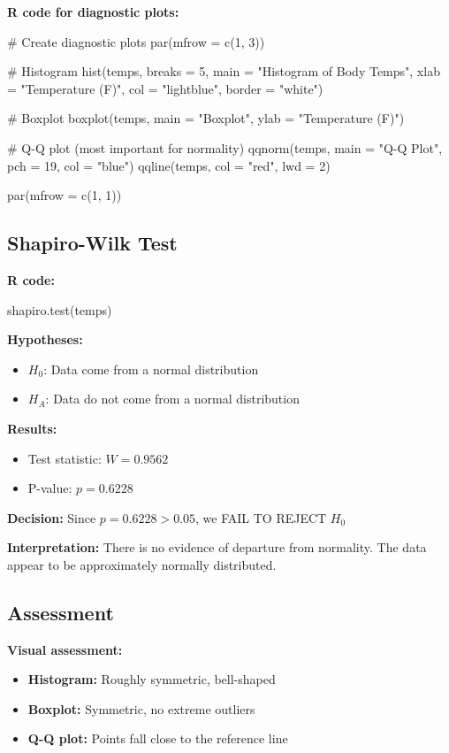 \documentclass[11pt]{article}
\begin{document}
\textbf{R code for diagnostic plots:}
\begin{rcode}
# Create diagnostic plots
par(mfrow = c(1, 3))

# Histogram
hist(temps, breaks = 5, main = "Histogram of Body Temps",
     xlab = "Temperature (F)", col = "lightblue", border = "white")

# Boxplot
boxplot(temps, main = "Boxplot", ylab = "Temperature (F)")

# Q-Q plot (most important for normality)
qqnorm(temps, main = "Q-Q Plot", pch = 19, col = "blue")
qqline(temps, col = "red", lwd = 2)

par(mfrow = c(1, 1))
\end{rcode}

\subsection*{Shapiro-Wilk Test}

\textbf{R code:}
\begin{rcode}
shapiro.test(temps)
\end{rcode}

\textbf{Hypotheses:}
\begin{itemize}
\item $H_0$: Data come from a normal distribution
\item $H_A$: Data do not come from a normal distribution
\end{itemize}

\textbf{Results:}
\begin{itemize}
\item Test statistic: $W = 0.9562$
\item P-value: $p = 0.6228$
\end{itemize}

\textbf{Decision:} Since $p = 0.6228 > 0.05$, we FAIL TO REJECT $H_0$

\textbf{Interpretation:} There is no evidence of departure from normality. The data appear to be approximately normally distributed.

\subsection*{Assessment}

\textbf{Visual assessment:}
\begin{itemize}
\item \textbf{Histogram:} Roughly symmetric, bell-shaped
\item \textbf{Boxplot:} Symmetric, no extreme outliers
\item \textbf{Q-Q plot:} Points fall close to the reference line
\end{itemize}
\end{document}
